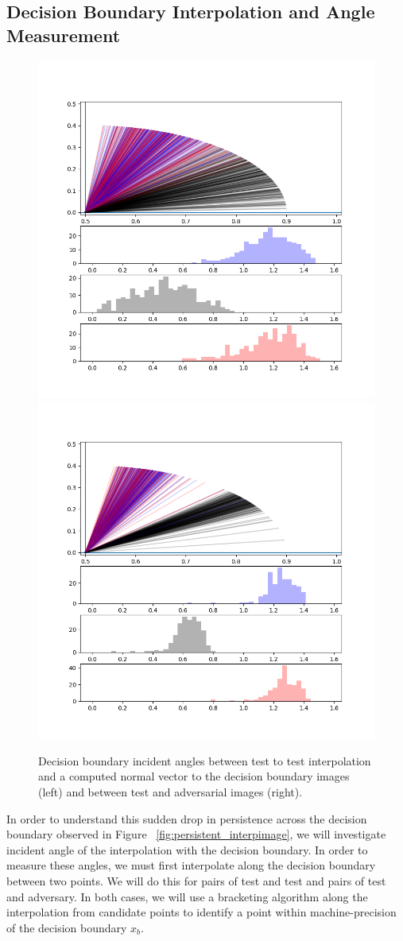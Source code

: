 \subsection{Decision Boundary Interpolation and Angle Measurement} \label{subsec:dbe}

\begin{figure}[!ht]
\centering\includegraphics[width=0.50\linewidth, trim=1.5cm 1.5cm 2cm 2cm, clip]{c3_figures/stab-mnist-C32-100-100-10-0.001-200-eval-1e-06-db_interp-angles-1stquadall199.png}\includegraphics[width=0.50\linewidth, trim=1.5cm 1.5cm 2cm 2cm, clip]{c3_figures/stab-mnist-C32-100-100-10-0.001-200-eval-1e-06-attack-db_interp-angles-1stquadall199.png}

\caption{Decision boundary incident angles between test to test
  interpolation and a computed normal vector to the decision boundary
  images (left) and between test and adversarial images
  (right).}
\label{fig:dba}
\end{figure}

In order to understand this sudden drop in persistence across the decision boundary observed in Figure ~\ref{fig:persistent_interpimage}, we will investigate incident angle of the interpolation with the decision boundary. In order to measure these angles, we must first interpolate along the decision boundary between two points. We will do this for pairs of test and test and pairs of test and adversary. In both cases, we will use a bracketing algorithm along the interpolation from candidate points to identify a point within machine-precision of the decision boundary $x_b$. 

